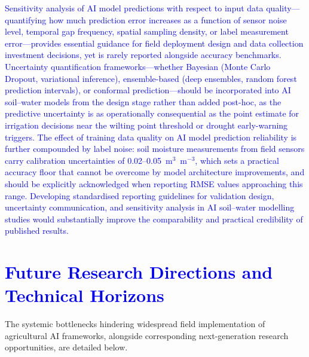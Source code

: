 \documentclass[land,article,submit,pdftex,moreauthors]{Definitions/mdpi}
\numberwithin{equation}{section}
\begin{document}
\textcolor{blue}{Sensitivity analysis of AI model predictions with respect to input data quality---quantifying how much prediction error increases as a function of sensor noise level, temporal gap frequency, spatial sampling density, or label measurement error---provides essential guidance for field deployment design and data collection investment decisions, yet is rarely reported alongside accuracy benchmarks. Uncertainty quantification frameworks---whether Bayesian (Monte Carlo Dropout, variational inference), ensemble-based (deep ensembles, random forest prediction intervals), or conformal prediction---should be incorporated into AI soil--water models from the design stage rather than added post-hoc, as the predictive uncertainty is as operationally consequential as the point estimate for irrigation decisions near the wilting point threshold or drought early-warning triggers. The effect of training data quality on AI model prediction reliability is further compounded by label noise: soil moisture measurements from field sensors carry calibration uncertainties of 0.02--0.05~m$^3$~m$^{-3}$, which sets a practical accuracy floor that cannot be overcome by model architecture improvements, and should be explicitly acknowledged when reporting RMSE values approaching this range. Developing standardised reporting guidelines for validation design, uncertainty communication, and sensitivity analysis in AI soil--water modelling studies would substantially improve the comparability and practical credibility of published results.}

\section{\textcolor{blue}{Future Research Directions and Technical Horizons}}

The systemic bottlenecks hindering widespread field implementation of agricultural AI frameworks, alongside corresponding next-generation research opportunities, are detailed below.
\end{document}
